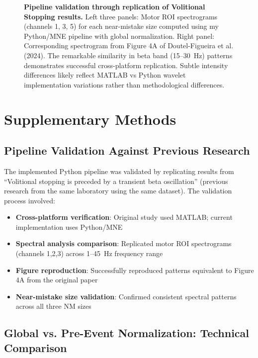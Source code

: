 \documentclass[11pt]{article}
\begin{document}
\begin{figure}[H]
\centering
\caption{\textbf{Pipeline validation through replication of Volitional Stopping results.} Left three panels: Motor ROI spectrograms (channels 1, 3, 5) for each near-mistake size computed using my Python/MNE pipeline with global normalization. Right panel: Corresponding spectrogram from Figure 4A of Doutel-Figueira et al. (2024). The remarkable similarity in beta band (15--30~Hz) patterns demonstrates successful cross-platform replication. Subtle intensity differences likely reflect MATLAB vs Python wavelet implementation variations rather than methodological differences.}
\label{fig:validation}
\end{figure}

\appendix

\section{Supplementary Methods}

\subsection{Pipeline Validation Against Previous Research}

The implemented Python pipeline was validated by replicating results from ``Volitional stopping is preceded by a transient beta oscillation'' (previous research from the same laboratory using the same dataset). The validation process involved:

\begin{itemize}
\item \textbf{Cross-platform verification}: Original study used MATLAB; current implementation uses Python/MNE
\item \textbf{Spectral analysis comparison}: Replicated motor ROI spectrograms (channels 1,2,3) across 1--45~Hz frequency range
\item \textbf{Figure reproduction}: Successfully reproduced patterns equivalent to Figure 4A from the original paper
\item \textbf{Near-mistake size validation}: Confirmed consistent spectral patterns across all three NM sizes
\end{itemize}

\subsection{Global vs. Pre-Event Normalization: Technical Comparison}
\end{document}
